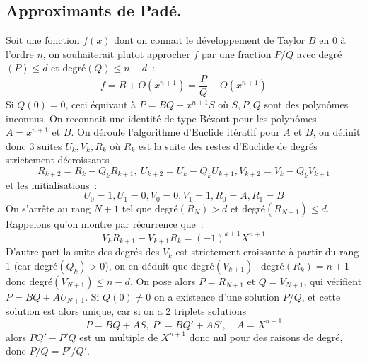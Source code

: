 \documentclass[a4paper,11pt]{article}
\begin{document}
\begin{giacjshere}
\subsection{Approximants de Padé.}
Soit une fonction $f(x)$ dont on connait le développement
de Taylor $B$ en 0 à l'ordre $n$, on souhaiterait plutot
approcher $f$ par une fraction $P/Q$ avec degré$(P) \leq d$
et degré$(Q) \leq n-d$~:
$$ f=B+O(x^{n+1})=\frac P Q +O(x^{n+1}) $$
Si $Q(0)=0$, ceci équivaut à $P=BQ+x^{n+1} S$ où $S, P,Q$ sont
des polynômes inconnus. On reconnait une identité de type
Bézout pour les polynômes $A=x^{n+1}$ et $B$.
On déroule l'algorithme d'Euclide itératif pour $A$ et $B$, on définit
donc 3 suites $U_k, V_k, R_k$ où $R_k$ est la suite des restes d'Euclide
de degrés strictement décroissants
$$ R_{k+2}=R_k - Q_k R_{k+1},\ U_{k+2}=U_k - Q_k U_{k+1}, V_{k+2}=V_k - Q_k V_{k+1} $$
et les initialisations~:
$$ U_0=1, U_1=0, V_0=0, V_1=1, R_0=A, R_1=B$$
On s'arrête au rang $N+1$ tel que degré$(R_N)>d$ et degré$(R_{N+1}) \leq d$.
Rappelons qu'on montre par récurrence que~:
$$ V_k R_{k+1} - V_{k+1} R_k = (-1)^{k+1} X^{n+1} $$
D'autre part la suite des degrés des $V_k$ est strictement croissante
à partir du rang 1 (car degré$(Q_k)>0$), on en déduit que
degré$(V_{k+1})$+degré$(R_k)=n+1$ donc degré$(V_{N+1}) \leq n-d$.
On pose alors $P=R_{N+1}$ et $Q=V_{N+1}$, qui vérifient
$P=BQ+AU_{N+1}$.
Si $Q(0) \neq 0$ on a existence d'une solution $P/Q$, 
et cette solution est alors
unique, car si on a 2 triplets solutions
$$ P=BQ+AS, \ P'=BQ'+AS', \quad A=X^{n+1}$$
alors $PQ'-P'Q$ est un multiple de $X^{n+1}$ donc nul pour des raisons
de degré, donc $P/Q=P'/Q'$.


\end{giacjshere}
\end{document}
